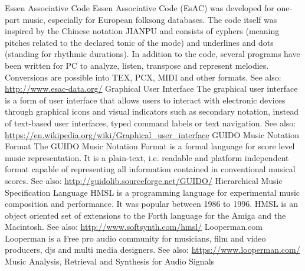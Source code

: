 	{Essen Associative Code}
	{Essen Associative Code (EsAC) was developed for one-part music, especially for European folksong databases. The code itself was inspired by the Chinese notation JIANPU and consists of cyphers (meaning pitches related to the declared tonic of the mode) and underlines and dots (standing for rhythmic durations). In addition to the code, several programs have been written for PC to analyze, listen, transpose and represent melodies.
Conversions are possible into TEX, PCX, MIDI and other formats. See also: \url{http://www.esac-data.org/}}
	{Graphical User Interface}
	{The graphical user interface is a form of user interface that allows users to interact with electronic devices through graphical icons and visual indicators such as secondary notation, instead of text-based user interfaces, typed command labels or text navigation. See also: \url{https://en.wikipedia.org/wiki/Graphical_user_interface}}
	{GUIDO Music Notation Format}
	{The GUIDO Music Notation Format is a formal language for score level music representation. It is a plain-text, i.e. readable and platform independent format capable of representing all information contained in conventional musical scores. See also: \url{http://guidolib.sourceforge.net/GUIDO/}}
	{Hierarchical Music Specification Language}
	{HMSL is a programming language for experimental music composition and performance. It was popular between 1986 to 1996. HMSL is an object oriented set of extensions to the Forth language for the Amiga and the Macintosh. See also: \url{http://www.softsynth.com/hmsl/}}
	{Looperman.com}
	{Looperman is a Free pro audio community for musicians, film and video producers, djs and multi media designers. See also: \url{https://www.looperman.com/}}
	{Music Analysis, Retrieval and Synthesis for Audio Signals}
